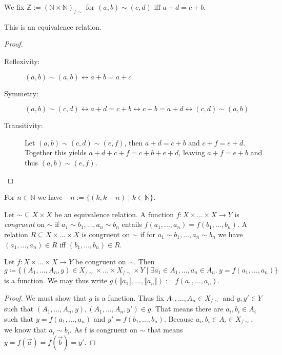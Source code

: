 \documentclass{whrartcl}
\newcommand{\NN}{\mathbb{N}}
\newcommand{\ZZ}{\mathbb{Z}}
\newcommand{\cls}[1]{\llbracket #1 \rrbracket}
\begin{document}
\begin{definition}[Integers]
  We fix $\ZZ := (\NN \times \NN)_{/ \sim}$ for
  \(
    (a, b) \sim (c, d) \text{ iff } a + d = c + b.
  \)
\end{definition}

\begin{lemma}
  This is an equivalence relation.
\end{lemma}
\begin{proof}
  \
  \begin{description}
  \item[Reflexivity:] $(a, b) \sim (a, b) \leftrightarrow a + b = a + c$
  \item[Symmetry:] $(a, b) \sim (c, d) \leftrightarrow a + d = c + b
    \leftrightarrow c + b = a + d \leftrightarrow (c, d) \sim (a, b)$
  \item[Transitivity:] Let $(a, b) \sim (c, d) \sim (e, f)$, then $a + d = c +
    b$ and $c + f = e + d$. Together this yields $a + d + c + f = c + b + e +
    d$, leaving $a + f = e + b$ and thus $(a, b) \sim (e, f)$.
  \end{description}
\end{proof}

\begin{example}
  For $n \in \NN$ we have $-n := \{(k, k + n) \mid k \in \NN\}$.
\end{example}

\begin{definition}
  Let $\sim \subseteq X \times X$ be an equivalence relation. A function $f : X
  \times \ldots \times X
  \to Y$ is \emph{congruent} on $\sim$ if $a_1 \sim b_1, \ldots, a_n \sim b_n$
  entails $f(a_1, \ldots, a_n) = f(b_1, \ldots, b_n)$. A relation $R \subseteq X
  \times \ldots \times X$ is congruent on $\sim$ if for $a_1 \sim b_1, \ldots,
  a_n \sim b_n$ we have $(a_1, \ldots, a_n) \in R$ iff $(b_1, \ldots, b_n) \in R$.
\end{definition}

\begin{lemma}
  Let $f : X \times \ldots \times X \to Y$ be congruent on $\sim$. Then
  \[
    g \coloneq \{(A_1, \ldots, A_n, y) \in X_{/ \sim} \times \ldots \times X_{/
      \sim} \times Y \mid \exists a_1 \in A_1, \ldots, a_n \in A_n.~y = f(a_1,
    \ldots, a_n) \}
  \]
  is a function. We may thus write $g(\cls{a_1}, \ldots, \cls{a_n}) := f(a_1,
  \ldots, a_n)$.
\end{lemma}
\begin{proof}
  We must show that $g$ is a function. Thus fix $A_1, \ldots, A_n \in X_{/
    \sim}$ and $y, y' \in Y$ such that $(A_1, \ldots, A_n, y), (A_1, \ldots,
  A_n, y') \in g$. That means there are $a_i, b_i \in A_i$ such that $y = f(a_1,
  \ldots, a_n)$ and $y' = f(b_1, \ldots, b_n)$. Because $a_i, b_i \in A_i \in
  X_{/ \sim}$, we know that $a_i \sim b_i$. As f is congruent on $\sim$ that
  means $y = f(\vec{a}) = f(\vec{b}) = y'$.
\end{proof}
\end{document}
